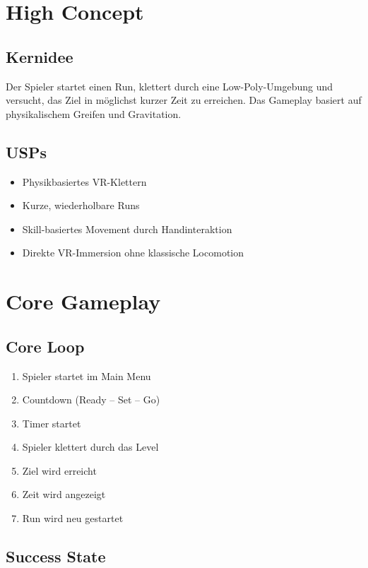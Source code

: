 \documentclass[11pt,a4paper]{article}
\begin{document}
\section{High Concept}

\subsection{Kernidee}

Der Spieler startet einen Run, klettert durch eine Low-Poly-Umgebung und versucht, das Ziel in möglichst kurzer Zeit zu erreichen. Das Gameplay basiert auf physikalischem Greifen und Gravitation.

\subsection{USPs}

\begin{itemize}
    \item Physikbasiertes VR-Klettern
    \item Kurze, wiederholbare Runs
    \item Skill-basiertes Movement durch Handinteraktion
    \item Direkte VR-Immersion ohne klassische Locomotion
\end{itemize}

\section{Core Gameplay}

\subsection{Core Loop}

\begin{enumerate}
    \item Spieler startet im Main Menu
    \item Countdown (Ready -- Set -- Go)
    \item Timer startet
    \item Spieler klettert durch das Level
    \item Ziel wird erreicht
    \item Zeit wird angezeigt
    \item Run wird neu gestartet
\end{enumerate}

\subsection{Success State}
\end{document}
